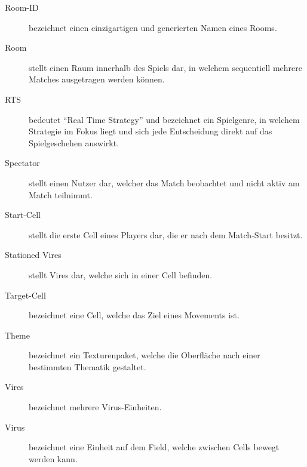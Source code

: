 \begin{description}
	\item[Room-ID] bezeichnet einen einzigartigen und generierten Namen eines Rooms.
	\item[Room] stellt einen Raum innerhalb des Spiels dar, in welchem sequentiell mehrere Matches ausgetragen werden können.
	\item[RTS] bedeutet ``Real Time Strategy'' und bezeichnet ein Spielgenre, in welchem Strategie im Fokus liegt und sich jede Entscheidung direkt auf das Spielgeschehen auswirkt.
	\item[Spectator] stellt einen Nutzer dar, welcher das Match beobachtet und nicht aktiv am Match teilnimmt.
	\item[Start-Cell] stellt die erste Cell eines Players dar, die er nach dem Match-Start besitzt.
	\item[Stationed Vires] stellt Vires dar, welche sich in einer Cell befinden.
	\item[Target-Cell] bezeichnet eine Cell, welche das Ziel eines Movements ist.
	\item[Theme] bezeichnet ein Texturenpaket, welche die Oberfläche nach einer bestimmten Thematik gestaltet.
	\item[Vires] bezeichnet mehrere Virus-Einheiten.
	\item[Virus] bezeichnet eine Einheit auf dem Field, welche zwischen Cells bewegt werden kann.
\end{description}